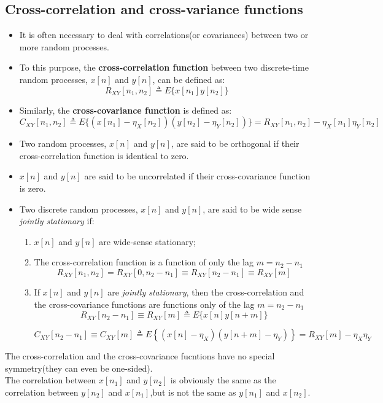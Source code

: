 \subsection{Cross-correlation and cross-variance functions}
\begin{itemize}
    \item It is often necessary to deal with correlations(or covariances) between two or more random processes.
    \item To this purpose, the \textbf{cross-correlation function} between two discrete-time random processes, \(x[n]\) and \(y[n]\), can be defined as:
    \[
    R_{XY}[n_1,n_2]\triangleq E\{x[n_1]y[n_2]\}
    \]
    \item Similarly, the \textbf{cross-covariance function} is defined as:
    \[
    C_{XY}[n_1,n_2]\triangleq E\{(x[n_1]-\eta_X[n_2])(y[n_2]-\eta_Y[n_2])\}=R_{XY}[n_1,n_2]-\eta_X[n_1]\eta_Y[n_2]
    \]
    \item Two random processes, \(x[n]\) and \(y[n]\), are said to be orthogonal if their cross-correlation function is identical to zero.
    \item \(x[n]\) and \(y[n]\) are said to be uncorrelated if their cross-covariance function is zero.
    \item Two discrete random processes, \(x[n]\) and \(y[n]\), are said to be wide sense \textit{jointly stationary} if:
    \begin{enumerate}
        \item \(x[n]\) and \(y[n]\) are wide-sense stationary;
        \item The cross-correlation function is a function of only the lag \(m=n_2-n_1\)
        \[
        R_{XY}[n_1,n_2]=R_{XY}[0,n_2-n_1]\equiv R_{XY}[n_2-n_1]\equiv R_{XY}[m]
        \]
        \item If \(x[n]\) and \(y[n]\) are \textit{jointly stationary}, then the cross-correlation and the cross-covariance functions are functions only of the lag \(m=n_2-n_1\)
        \[
R_{XY}[n_2-n_1] \equiv R_{XY}[m] \triangleq E\{ x[n] y[n+m] \}
\]

\[
C_{XY}[n_2-n_1] \equiv C_{XY}[m] \triangleq E \left\{ (x[n] - \eta_X)(y[n+m] - \eta_Y) \right\} = R_{XY}[m] - \eta_X \eta_Y
\]
    \end{enumerate}
\end{itemize}
The cross-correlation and the cross-covariance fucntions have no special symmetry(they can even be one-sided).\\
The correlation between \(x[n_1]\) and \(y[n_2]\) is obviously the same as the correlation between \(y[n_2]\) and \(x[n_1]\),but is not the same as \(y[n_1]\) and \(x[n_2]\).
